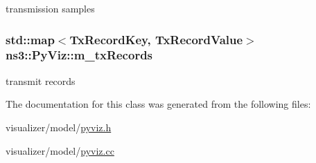 transmission samples 

\subsubsection[{\texorpdfstring{m\+\_\+tx\+Records}{m_txRecords}}]{\setlength{\rightskip}{0pt plus 5cm}std\+::map$<${\bf Tx\+Record\+Key}, {\bf Tx\+Record\+Value}$>$ ns3\+::\+Py\+Viz\+::m\+\_\+tx\+Records\hspace{0.3cm}{\ttfamily [private]}}\hypertarget{classns3_1_1PyViz_ad051157796c1dee630ca8705ed89bbb6}{}\label{classns3_1_1PyViz_ad051157796c1dee630ca8705ed89bbb6}


transmit records 



The documentation for this class was generated from the following files\+:\begin{DoxyCompactItemize}
\item 
visualizer/model/\hyperlink{pyviz_8h}{pyviz.\+h}\item 
visualizer/model/\hyperlink{pyviz_8cc}{pyviz.\+cc}\end{DoxyCompactItemize}
